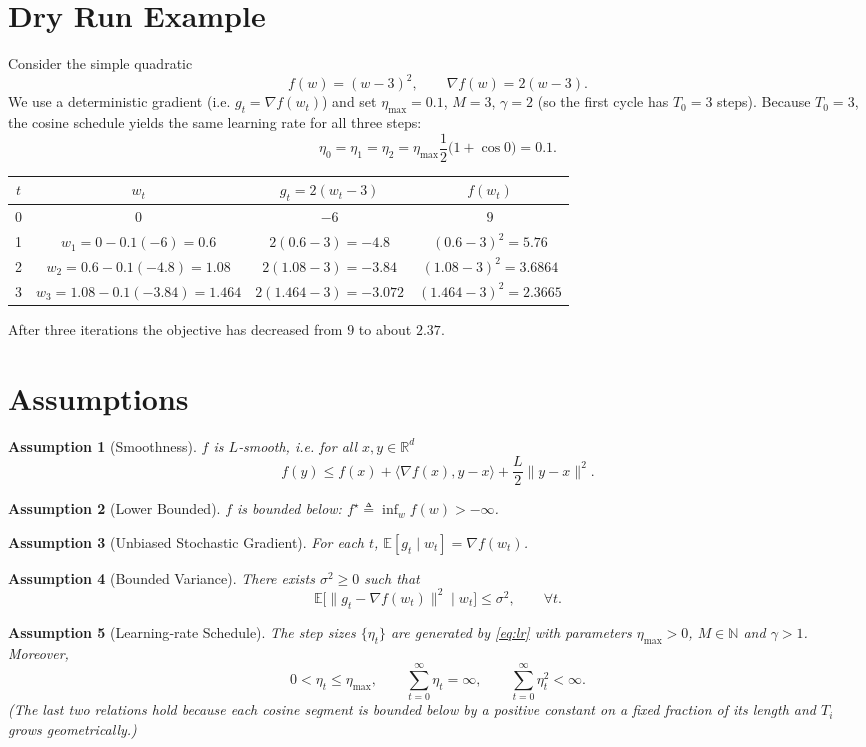 \documentclass{article}
\newtheorem{assumption}{Assumption}
\begin{document}
\section*{Dry Run Example}
Consider the simple quadratic
\[
f(w)=(w-3)^2,\qquad \nabla f(w)=2(w-3).
\]
We use a deterministic gradient (i.e. $g_t=\nabla f(w_t)$) and set
$\eta_{\max}=0.1$, $M=3$, $\gamma=2$ (so the first cycle has $T_0=3$ steps).
Because $T_0=3$, the cosine schedule yields the same learning rate for all
three steps:
\[
\eta_0=\eta_1=\eta_2=\eta_{\max}\frac{1}{2}\bigl(1+\cos 0\bigr)=0.1.
\]

\begin{center}
\begin{tabular}{c|c|c|c}
$t$ & $w_t$ & $g_t=2(w_t-3)$ & $f(w_t)$\\ \hline
0 & $0$ & $-6$ & $9$\\
1 & $w_1=0-0.1(-6)=0.6$ & $2(0.6-3)=-4.8$ & $(0.6-3)^2=5.76$\\
2 & $w_2=0.6-0.1(-4.8)=1.08$ & $2(1.08-3)=-3.84$ & $(1.08-3)^2=3.6864$\\
3 & $w_3=1.08-0.1(-3.84)=1.464$ & $2(1.464-3)=-3.072$ & $(1.464-3)^2=2.3665$
\end{tabular}
\end{center}
After three iterations the objective has decreased from $9$ to about $2.37$.

\newpage
\section*{Assumptions}
\begin{assumption}[Smoothness]\label{as:smooth}
$f$ is $L$‑smooth, i.e. for all $x,y\in\mathbb{R}^{d}$
\[
f(y)\le f(x)+\langle\nabla f(x),y-x\rangle+\frac{L}{2}\|y-x\|^{2}.
\]
\end{assumption}
\begin{assumption}[Lower Bounded]\label{as:lb}
$f$ is bounded below: $f^{\star}\triangleq\inf_{w}f(w)>-\infty$.
\end{assumption}
\begin{assumption}[Unbiased Stochastic Gradient]\label{as:unbiased}
For each $t$, $\mathbb{E}[g_t\mid w_t]=\nabla f(w_t)$.
\end{assumption}
\begin{assumption}[Bounded Variance]\label{as:variance}
There exists $\sigma^{2}\ge0$ such that
\[
\mathbb{E}\!\big[\|g_t-\nabla f(w_t)\|^{2}\mid w_t\big]\le\sigma^{2},
\qquad\forall t.
\]
\end{assumption}
\begin{assumption}[Learning‑rate Schedule]\label{as:schedule}
The step sizes $\{\eta_t\}$ are generated by \eqref{eq:lr} with parameters
$\eta_{\max}>0$, $M\in\mathbb{N}$ and $\gamma>1$.  Moreover,
\[
0<\eta_t\le\eta_{\max},\qquad 
\sum_{t=0}^{\infty}\eta_t=\infty,\qquad 
\sum_{t=0}^{\infty}\eta_t^{2}<\infty.
\tag{A5}
\]
(The last two relations hold because each cosine segment is bounded below by
a positive constant on a fixed fraction of its length and $T_i$ grows
geometrically.)
\end{assumption}
\end{document}
